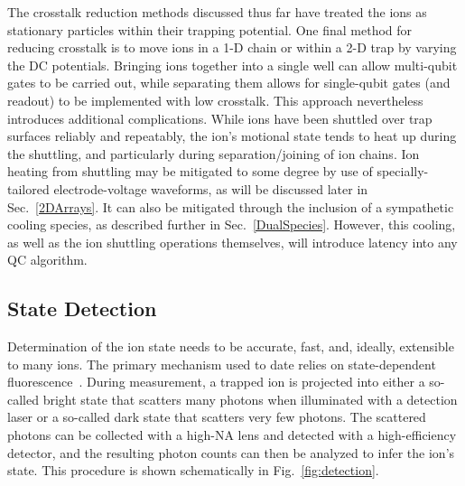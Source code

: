 \documentclass[%
12pt,
 amsmath,amssymb,
]{revtex4-2}
\newcommand{\one}{|1 \rangle}
\begin{document}
The crosstalk reduction methods discussed thus far have treated the ions as stationary particles within their trapping potential. One final method for reducing crosstalk is to move ions in a 1-D chain \cite{NIST:ion_transport:2002,WarringIndividualAddress2013} or within a 2-D trap \cite{KielpinskiQCArchitecture2002} by varying the DC potentials. Bringing ions together into a single well can allow multi-qubit gates to be carried out, while separating them allows for single-qubit gates (and readout) to be implemented with low crosstalk. This approach nevertheless introduces additional complications. While ions have been shuttled over trap surfaces reliably and repeatably, the ion's motional state tends to heat up during the shuttling, and particularly during separation/joining of ion chains. Ion heating from shuttling may be mitigated to some degree by use of specially-tailored electrode-voltage waveforms, as will be discussed later in Sec.~\ref{2DArrays}.  It can also be mitigated through the inclusion of a sympathetic cooling species, as described further in Sec.~\ref{DualSpecies}. However, this cooling, as well as the ion shuttling operations themselves, will introduce latency into any QC algorithm.

\subsection{State Detection}
\label{Detection}
Determination of the ion state needs to be accurate, fast, and, ideally, extensible to many ions. The primary mechanism used to date relies on state-dependent fluorescence~\cite{PhysRevLett.56.2797,PhysRevLett.57.1699,PhysRevLett.57.1696}. During measurement, a trapped ion is projected into either a so-called bright state that scatters many photons when illuminated with a detection laser or a so-called dark state that scatters very few photons. The scattered photons can be collected with a high-NA lens and detected with a high-efficiency detector, and the resulting photon counts can then be analyzed to infer the ion's state. This procedure is shown schematically in Fig.~\ref{fig:detection}.

\end{document}
